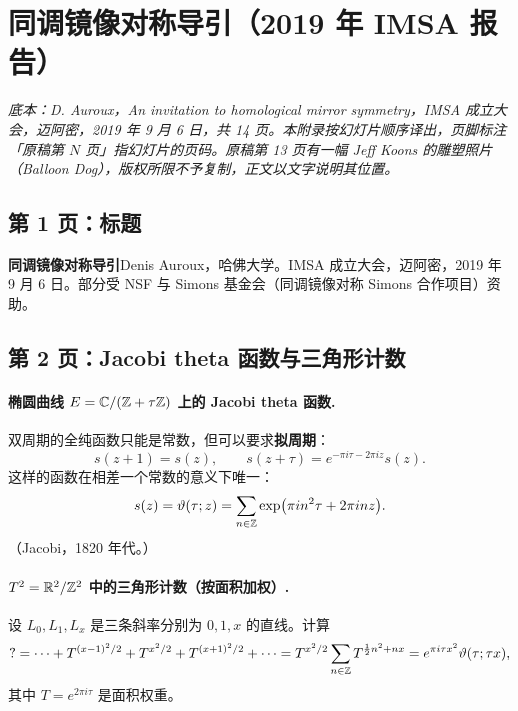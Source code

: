 \section{同调镜像对称导引（2019 年 IMSA 报告）}

\noindent\emph{底本：D. Auroux，\emph{An invitation to homological mirror symmetry}，IMSA 成立大会，迈阿密，2019 年 9 月 6 日，共 14 页。本附录按幻灯片顺序译出，页脚标注「原稿第 $N$ 页」指幻灯片的页码。原稿第 13 页有一幅 Jeff Koons 的雕塑照片（\emph{Balloon Dog}），版权所限不予复制，正文以文字说明其位置。}

\subsection*{第 1 页：标题}

{\bfseries 同调镜像对称导引}\quad Denis Auroux，哈佛大学。IMSA 成立大会，迈阿密，2019 年 9 月 6 日。部分受 NSF 与 Simons 基金会（同调镜像对称 Simons 合作项目）资助。

\subsection*{第 2 页：Jacobi theta 函数与三角形计数}

\paragraph{椭圆曲线 $E=\mathbb{C}/(\mathbb{Z}+\tau\mathbb{Z})$ 上的 Jacobi theta 函数.} 双周期的全纯函数只能是常数，但可以要求\textbf{拟周期}：
\[
s(z+1)=s(z),\qquad s(z+\tau)=e^{-\pi i\tau-2\pi iz}s(z).
\]
这样的函数在相差一个常数的意义下唯一：
\[
s(z)=\vartheta(\tau;z)=\sum_{n\in\mathbb{Z}}\exp\bigl(\pi in^2\tau+2\pi inz\bigr).
\]
（Jacobi，1820 年代。）

\paragraph{$T^2=\mathbb{R}^2/\mathbb{Z}^2$ 中的三角形计数（按面积加权）.} 设 $L_0,L_1,L_x$ 是三条斜率分别为 $0,1,x$ 的直线。计算
\[
?=\cdots+T^{(x-1)^2/2}+T^{x^2/2}+T^{(x+1)^2/2}+\cdots
=T^{x^2/2}\sum_{n\in\mathbb{Z}}T^{\frac12n^2+nx}
=e^{\pi i\tau x^2}\vartheta(\tau;\tau x),
\]
其中 $T=e^{2\pi i\tau}$ 是面积权重。

